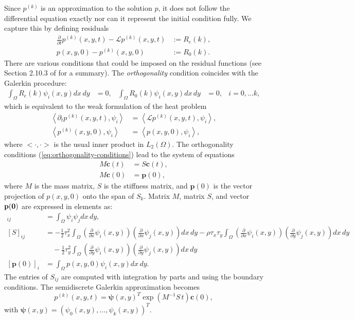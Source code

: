 \documentclass[10pt]{article}
\begin{document}
Since $p^{(k)}$ is an approximation to the solution $p$, it
does not follow the differential equation exactly nor can it represent
the initial condition fully. We capture this by defining residuals
\begin{align*}
  \frac{\partial}{\partial t} p^{(k)}(x,y,t) - \mathcal{L}p^{(k)}(x,y,t) &:= R_e(k), \\
  p(x,y,0) - p^{(k)}(x,y,0) &:= R_0(k).
\end{align*}
There are various conditions that could be imposed on the residual
functions (see Section 2.10.3 of \cite{norrie1973finite} for a
summary). The \textit{orthogonality} condition coincides with the
Galerkin procedure:
\begin{align}
  \displaystyle \int_{\Omega} R_e(k) \psi_i(x,y) dx\,dy &= 0,& \displaystyle \int_{\Omega} R_0(k) \psi_i(x,y) dx\,dy &= 0,& i = 0,\ldots k, \label{eq:orthogonality-conditions}
\end{align}
which is equivalent to the weak formulation of the heat problem
\begin{align*}
  \left< \partial_t p^{(k)}(x,y,t), \psi_i \right> &= \left<\mathcal{L}p^{(k)}(x,y,t), \psi_i \right>, \\
  \left< p^{(k)}(x,y,0), \psi_i \right> &= \left<p(x,y,0), \psi_i\right>,
\end{align*}
where $<\cdot, \cdot>$ is the usual inner product in
$L_2(\Omega)$. The orthogonality conditions
(\ref{eq:orthogonality-conditions}) lead to the system of equations
\begin{align}
  M \mathbf{\dot{c}}(t) &= S \mathbf{c}(t), \label{eq:orthogonality-conditions-mat-1}\\
  M \mathbf{c}(0) &= \mathbf{p}(0), \label{eq:orthogonality-conditions-mat-2}
\end{align}
where $M$ is the mass matrix, $S$ is the stiffness matrix, and
$\mathbf{p}(0)$ is the vector projection of $p(x,y,0)$ onto the
span of $S_k$. Matrix $M$, matrix $S$, and vector $\bf{p}(0)$ are expressed in elements as:
\begin{align*}
  [M]_{ij} &= \displaystyle \int_\Omega \psi_i \psi_j dx\,dy, \\
  [S]_{ij} &= -\frac{1}{2}\tau_x^2 \displaystyle \int_\Omega \left( \frac{\partial}{\partial x} \psi_i(x,y) \right) \left( \frac{\partial}{\partial x} \psi_j(x,y) \right) dx\,dy -\rho\tau_x\tau_y \displaystyle \int_\Omega \left( \frac{\partial}{\partial x} \psi_i(x,y) \right) \left( \frac{\partial}{\partial y} \psi_j(x,y) \right) dx\,dy \\
         &\quad -\frac{1}{2}\tau_y^2 \displaystyle \int_\Omega \left( \frac{\partial}{\partial y} \psi_i(x,y) \right) \left( \frac{\partial}{\partial y} \psi_j(x,y) \right) dx\,dy \\
  [\mathbf{p}(0)]_i &= \displaystyle \int_\Omega p(x,y,0) \psi_i(x,y) dx\,dy.
\end{align*}
The entries of $S_{ij}$ are computed with integration by parts and
using the boundary conditions. The semidiscrete Galerkin approximation
becomes
\[
  p^{(k)}(x,y,t) = \boldsymbol{\psi}(x,y)^T \exp\left( M^{-1}S\, t \right) \mathbf{c}(0),
\]
with $\boldsymbol{\psi}(x,y) = (\psi_0(x,y), \ldots, \psi_k(x,y))^T.$
\end{document}
